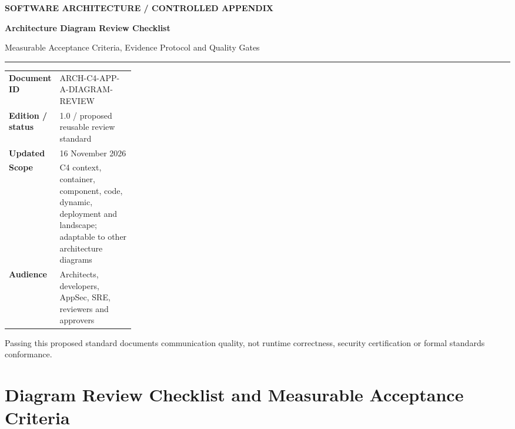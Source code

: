 \documentclass[10pt,letterpaper]{article}
\begin{document}
\begin{titlepage}
\renewcommand{\thepage}{title-\arabic{page}}
\vspace*{0.65in}
{\sffamily\bfseries\small\color{C4Teal}SOFTWARE ARCHITECTURE / CONTROLLED APPENDIX}\par\vspace{0.23in}
{\sffamily\bfseries\fontsize{28}{32}\selectfont Architecture Diagram Review Checklist}\par\vspace{0.18in}
{\sffamily\fontsize{17}{22}\selectfont Measurable Acceptance Criteria, Evidence Protocol and Quality Gates}\par\vspace{0.33in}
\textcolor{C4Teal}{\rule{\linewidth}{1.2pt}}\par\vspace{0.26in}
\begin{tabularx}{\linewidth}{@{}>{\raggedright\arraybackslash}p{0.25\linewidth}Y@{}}
\textbf{Document ID} & ARCH-C4-APP-A-DIAGRAM-REVIEW\\
\textbf{Edition / status} & 1.0 / proposed reusable review standard\\
\textbf{Updated} & 16 November 2026\\
\textbf{Scope} & C4 context, container, component, code, dynamic, deployment and landscape; adaptable to other architecture diagrams\\
\textbf{Audience} & Architects, developers, AppSec, SRE, reviewers and approvers\\
\end{tabularx}
\vspace{0.35in}
\vfill
{\small\color{C4Gray}Passing this proposed standard documents communication quality, not runtime correctness, security certification or formal standards conformance.}\par
\end{titlepage}
\tableofcontents
\clearpage
\appendix
\renewcommand{\thetable}{A-\arabic{table}}
\section{Diagram Review Checklist and Measurable Acceptance Criteria}
\label{app:diagram-review}
\end{document}
